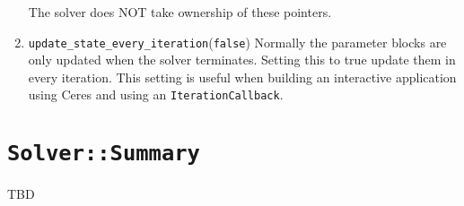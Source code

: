 \begin{enumerate}
     The solver does NOT take ownership of these pointers.

\item{\texttt{update\_state\_every\_iteration}}(\texttt{false})
Normally the parameter blocks are only updated when the solver terminates. Setting this to true update them in every iteration. This setting is useful when building an interactive application using Ceres and using an \texttt{IterationCallback}.
\end{enumerate}

\section{\texttt{Solver::Summary}}
TBD